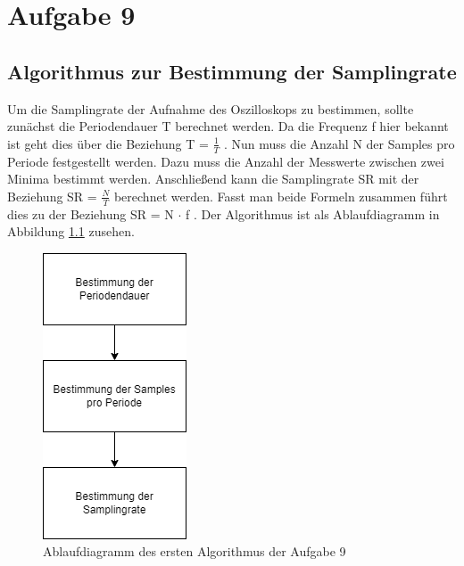 \chapter{Aufgabe 9}
\section{Algorithmus zur Bestimmung der Samplingrate}
Um die Samplingrate der Aufnahme des Oszilloskops zu bestimmen, sollte zunächst die Periodendauer T berechnet werden.
Da die Frequenz f hier bekannt ist geht dies über die Beziehung T = $\frac{1}{T}$ .
Nun muss die Anzahl N der Samples pro Periode festgestellt werden.
Dazu muss die Anzahl der Messwerte zwischen zwei Minima bestimmt werden.
Anschließend kann die Samplingrate SR mit der Beziehung SR = $\frac{N}{T}$ berechnet werden.
Fasst man beide Formeln zusammen führt dies zu der Beziehung SR = N $\cdot$ f .
Der Algorithmus ist als Ablaufdiagramm in Abbildung \ref{algo1} zusehen. \par 

\begin{figure}[h]
	\centering
	\includegraphics[scale=0.5]{Images/aufgabe9_algo1.png}
	\caption{Ablaufdiagramm des ersten Algorithmus der Aufgabe 9}
	\label{algo1}
\end{figure}

